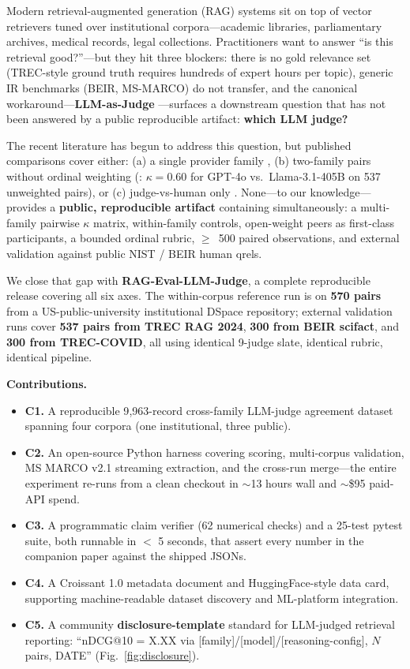 \documentclass{article}
\begin{document}
Modern retrieval-augmented generation (RAG) systems sit on top of vector retrievers tuned over institutional corpora---academic libraries, parliamentary archives, medical records, legal collections. Practitioners want to answer ``is this retrieval good?''---but they hit three blockers: there is no gold relevance set (TREC-style ground truth requires hundreds of expert hours per topic), generic IR benchmarks (BEIR, MS-MARCO) do not transfer, and the canonical workaround---\textbf{LLM-as-Judge} \citep{zheng2023judge,faggioli2023perspectives,rahmani2024judges,upadhyay2024umbrela}---surfaces a downstream question that has not been answered by a public reproducible artifact: \textbf{which LLM judge?}

The recent literature has begun to address this question, but published comparisons cover either: (a) a single provider family \citep{balog2025rankersjudges,farzi2025umbrela_other}, (b) two-family pairs without ordinal weighting (\citealp{thakur2025trecragsupport}: $\kappa = 0.60$ for GPT-4o vs.\ Llama-3.1-405B on 537 unweighted pairs), or (c) judge-vs-human only \citep{han2025judgesverdict}. None---to our knowledge---provides a \textbf{public, reproducible artifact} containing simultaneously: a multi-family pairwise $\kappa$ matrix, within-family controls, open-weight peers as first-class participants, a bounded ordinal rubric, $\geq$~500 paired observations, and external validation against public NIST / BEIR human qrels.

We close that gap with \textbf{RAG-Eval-LLM-Judge}, a complete reproducible release covering all six axes. The within-corpus reference run is on \textbf{570 pairs} from a US-public-university institutional DSpace repository; external validation runs cover \textbf{537 pairs from TREC RAG 2024}, \textbf{300 from BEIR scifact}, and \textbf{300 from TREC-COVID}, all using identical 9-judge slate, identical rubric, identical pipeline.

\textbf{Contributions.}
\begin{itemize}
\item \textbf{C1.} A reproducible 9{,}963-record cross-family LLM-judge agreement dataset spanning four corpora (one institutional, three public).
\item \textbf{C2.} An open-source Python harness covering scoring, multi-corpus validation, MS MARCO v2.1 streaming extraction, and the cross-run merge---the entire experiment re-runs from a clean checkout in $\sim$13 hours wall and $\sim$\$95 paid-API spend.
\item \textbf{C3.} A programmatic claim verifier (62 numerical checks) and a 25-test pytest suite, both runnable in $<$ 5 seconds, that assert every number in the companion paper against the shipped JSONs.
\item \textbf{C4.} A Croissant 1.0 metadata document and HuggingFace-style data card, supporting machine-readable dataset discovery and ML-platform integration.
\item \textbf{C5.} A community \textbf{disclosure-template} standard for LLM-judged retrieval reporting: ``nDCG@10 = X.XX via [family]/[model]/[reasoning-config], $N$ pairs, DATE'' (Fig.~\ref{fig:disclosure}).
\end{itemize}
\end{document}
